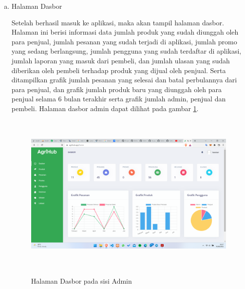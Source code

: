 \begin{enumerate}
\begin{enumerate}[a.]
		\item Halaman Dasbor
		\par Setelah berhasil masuk ke aplikasi, maka akan tampil halaman dasbor. Halaman ini berisi informasi data jumlah produk yang sudah diunggah oleh para penjual, jumlah pesanan yang sudah terjadi di aplikasi, jumlah promo yang sedang berlangsung, jumlah pengguna yang sudah terdaftar di aplikasi, jumlah laporan yang masuk dari pembeli, dan jumlah ulasan yang sudah diberikan oleh pembeli terhadap produk yang dijual oleh penjual. Serta ditampilkan grafik jumlah pesanan yang selesai dan batal perbulannya dari para penjual, dan grafik jumlah produk baru yang diunggah oleh para penjual selama 6 bulan terakhir serta grafik jumlah admin, penjual dan pembeli. Halaman dasbor admin dapat dilihat pada gambar \ref*{dashboard_admin}.
		\begin{figure}[H]
			\centering
			{\includegraphics [width = 13.5cm, height= 8cm]{gambar/admin/dashboard_admin}}
			\caption{Halaman Dasbor pada sisi Admin}
			\label{dashboard_admin}
		\end{figure}


\end{enumerate}
\end{enumerate}
